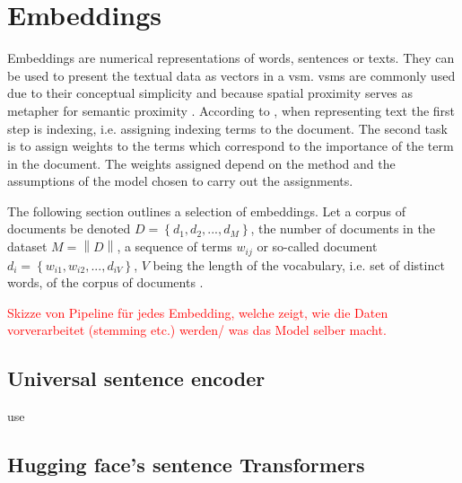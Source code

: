 \section{Embeddings}\label{sec:embeddings}

Embeddings are numerical representations of words, sentences or texts.
They can be used to present the textual data as vectors in a \ac{vsm}.
\acp{vsm} are commonly used due to their conceptual simplicity and because spatial proximity serves as metapher for semantic proximity \cite{tfidf2008}.
According to \citeauthor{tfidf2008}, when representing text the first step is indexing, i.e. assigning indexing terms to the document.
The second task is to assign weights to the terms which correspond to the importance of the term in the document.
The weights assigned depend on the method and the assumptions of the model chosen to carry out the assignments.

The following section outlines a selection of embeddings.
Let a corpus of documents be denoted $D= \left\{d_1, d_2, ..., d_M  \right\}$, the number of documents in the dataset $M = \left\| D \right\|$,
a sequence of terms $w_{ij}$ or so-called document $d_i = \left\{w_{i1}, w_{i2}, ..., d_{iV}  \right\}$, $V$ being the length of the vocabulary, 
i.e. set of distinct words, of the corpus of documents \cite{clusteringDocs2020}.

\cite{WordRep2013}
\cite{SentRep2014}

\textcolor{red}{Skizze von Pipeline für jedes Embedding, welche zeigt, wie die Daten vorverarbeitet (stemming etc.) werden/ was das Model selber macht.}










\subsection{Universal sentence encoder}\label{subsec:univ-sent-encoder}
\ac{use}
\cite{UniversalSentEnc2018}

\subsection{\infersent{}}\label{subsec:inferSent}
\infersent{}
\cite{inferSent2018}

\subsection{Hugging face's sentence Transformers}\label{subsec:hf-sent-ransformers}
\cite{HfsentTrans2019}